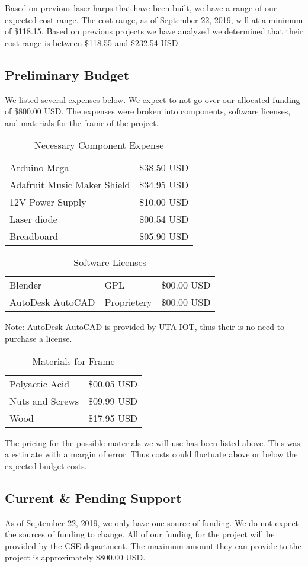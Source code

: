 Based on previous laser harps that have been built, we have a range of our expected cost range. The cost range, as of September 22, 2019, will at a minimum of \$118.15. Based on previous projects we have analyzed we determined that their cost range is between \$118.55 and \$232.54 USD. 

\subsection{Preliminary Budget}
We listed several expenses below. We expect to not go over our allocated funding of \$800.00 USD. The expenses were broken into components, software licenses, and materials for the frame of the project.
\begin{table}[h]
\centering
\caption{Necessary Component Expense}
\begin{tabular}{ll}
Arduino Mega                & \$38.50 USD \\
Adafruit Music Maker Shield & \$34.95 USD \\
12V Power Supply            & \$10.00 USD \\
Laser diode                 & \$00.54 USD \\
Breadboard                  & \$05.90 USD 
\end{tabular}
\end{table}

\begin{table}[h]
\centering
\caption{Software Licenses}
\begin{tabular}{lll}
Blender             & GPL           & \$00.00 USD\\
AutoDesk AutoCAD    & Proprietery   & \$00.00 USD\\ 
\end{tabular}
\end{table}

Note: AutoDesk AutoCAD is provided by UTA IOT, thus their is no need to purchase a license.

\begin{table}[h]
\centering
\caption{Materials for Frame}
\begin{tabular}{ll}
Polyactic Acid  & \$00.05  USD \\
Nuts and Screws & \$09.99  USD \\
Wood            & \$17.95  USD
\end{tabular}
\end{table}

The pricing for the possible materials we will use has been listed above. This was a estimate with a margin of error. Thus costs could fluctuate above or below the expected budget costs.

\subsection{Current \& Pending Support}
As of September 22, 2019, we only have one source of funding. We do not expect the sources of funding to change. All of our funding for the project will be provided by the CSE department. The maximum amount they can provide to the project is approximately \$800.00 USD.